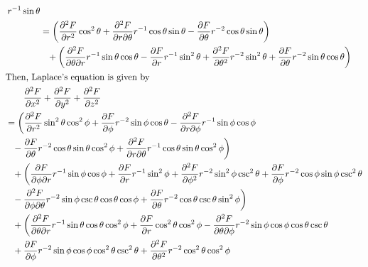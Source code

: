 \documentclass[12pt]{article}
\begin{document}
\begin{gather*}
\begin{aligned}
			r^{-1}\sin\theta \\
		&= \left( 
				\frac{\partial^2F} {\partial r^2} \cos^2\theta
				+ \frac{\partial^2F} {\partial r\partial\theta}
					r^{-1}\cos\theta\sin\theta
				- \frac{\partial F} {\partial \theta} r^{-2}\cos\theta\sin\theta
			\right) \\
			&\phantom{=} + \left( 
				\frac{\partial^2F} {\partial\theta\partial r}
					r^{-1}\sin\theta\cos\theta
				- \frac{\partial F} {\partial r} r^{-1}\sin^2\theta
				+ \frac{\partial^2F} {\partial \theta^2} r^{-2}\sin^2\theta
				+ \frac{\partial F} {\partial \theta} r^{-2}\sin\theta\cos\theta
			\right) \\
	\end{aligned} \\
	\begin{aligned}
		\shortintertext{Then, Laplace's equation is given by}
		&\qquad \frac{\partial^2 F}{\partial x^2} + \frac{\partial^2 F}{\partial y^2}
			+ \frac{\partial^2 F}{\partial z^2}  \\ 
		&= \biggl( \frac{\partial^2 F} {\partial r^2} \sin^2\theta\cos^2\phi
			+ \frac{\partial F} {\partial \phi} r^{-2}\sin\phi\cos\theta 
			- \frac{\partial^2 F} {\partial r \partial\phi}
			r^{-1}\sin\phi\cos\phi \\
		&\phantom{=} -\frac{\partial F} {\partial \theta}
			r^{-2}\cos\theta\sin\theta\cos^2\phi
			+\frac{\partial^2 F} {\partial r \partial\theta}
			r^{-1}\cos\theta\sin\theta\cos^2\phi \biggl) \\
		&\phantom{=} +\biggl( 
			\frac{\partial F} {\partial\phi \partial r} r^{-1}\sin\phi\cos\phi
			+ \frac{\partial F} {\partial r} r^{-1}\sin^2\phi
			+ \frac{\partial^2 F} {\partial \phi^2} r^{-2}\sin^2\phi\csc^2\theta 
			+ \frac{\partial F} {\partial \phi} r^{-2}\cos\phi\sin\phi\csc^2\theta  \\
		&\phantom{=} -\frac{\partial^2 F} {\partial\phi \partial\theta} 
			r^{-2}\sin\phi\csc\theta\cos\theta\cos\phi +\frac{\partial F} {\partial
			\theta}r^{-2}\cos\theta\csc\theta\sin^2\phi \biggl) \\
		&\phantom{=} + \biggl( \frac{\partial^2 F} {\partial\theta \partial r} 
			r^{-1}\sin\theta\cos\theta\cos^2\phi
			+ \frac{\partial F} {\partial r} \cos^2\theta\cos^2\phi
			- \frac{\partial^2 F} {\partial\theta \partial\phi}
			r^{-2}\sin\phi\cos\phi\cos\theta\csc\theta \\
		&\phantom{=} 
			+ \frac{\partial F} {\partial \phi}
			r^{-2}\sin\phi\cos\phi\cos^2\theta\csc^2\theta
			+\frac{\partial^2 F} {\partial\theta^2} r^{-2}\cos^2\theta\cos^2\phi 

\end{aligned}
\end{gather*}
\end{document}
